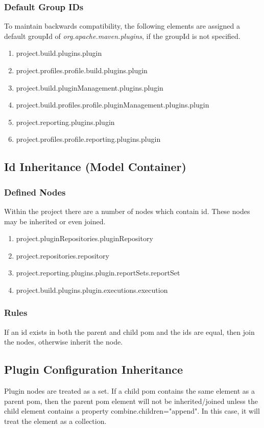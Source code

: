 \documentclass[12pt]{amsart}
\begin{document}
\subsubsection{Default Group IDs}
To maintain backwards compatibility, the following elements are assigned a default groupId of \emph{org.apache.maven.plugins}, if the groupId is not specified. 
\begin{enumerate}
\item project.build.plugins.plugin
\item project.profiles.profile.build.plugins.plugin
\item project.build.pluginManagement.plugins.plugin
\item project.build.profiles.profile.pluginManagement.plugins.plugin
\item project.reporting.plugins.plugin
\item project.profiles.profile.reporting.plugins.plugin
\end{enumerate}

\subsection{Id Inheritance (Model Container)}

\subsubsection{Defined Nodes}
Within the project there are a number of nodes which contain id. These nodes may be inherited or even joined.
\begin{enumerate}
\item project.pluginRepositories.pluginRepository
\item project.repositories.repository
\item project.reporting.plugins.plugin.reportSets.reportSet
\item project.build.plugins.plugin.executions.execution
\end{enumerate}

\subsubsection{Rules}
If an id exists in both the parent and child pom and the ids are equal, then join the nodes, otherwise inherit the node. 

\subsection{Plugin Configuration Inheritance}
Plugin nodes are treated as a set. If a child pom contains the same element as a parent pom, then the parent pom element will not be inherited/joined unless the child element contains a property combine.children="append". In this case, it will treat the element as a collection.
\end{document}
